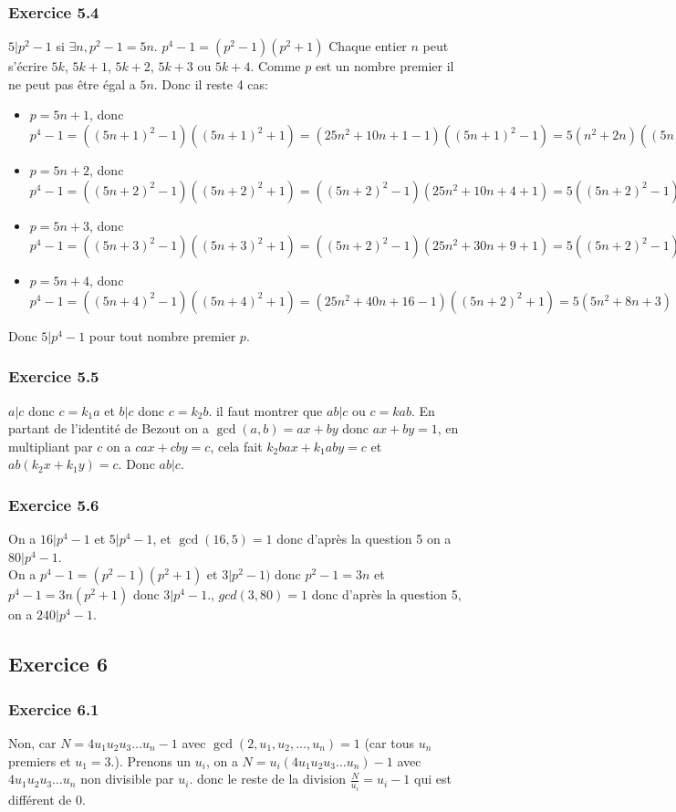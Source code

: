 \documentclass[]{book}
\theoremstyle{definition}
\begin{document}
\subsubsection*{Exercice 5.4}
$5 | p^2-1$ si $\exists n, p^2-1 = 5n$. 
$p^4 -1 = (p^2-1)(p^2+1)$
Chaque entier $n$ peut s'\'ecrire $5k$, $5k+1$, $5k+2$, $5k+3$ ou $5k+4$. Comme $p$ est un nombre premier il ne peut pas \^etre \'egal a $5n$. Donc il reste 4 cas:
\begin{itemize}
\item $p = 5n+1$, donc $p^4-1 = ((5n+1)^2-1)((5n+1)^2+1) = (25n^2+10n+1-1)((5n+1)^2-1) = 5(n^2+2n)((5n+1)^2-1)$
\item $p = 5n+2$, donc $p^4-1 = ((5n+2)^2-1)((5n+2)^2+1) = ((5n+2)^2-1)(25n^2+10n+4+1) = 5((5n+2)^2-1)(5n^2+2n+1)$
\item $p = 5n+3$, donc $p^4-1 = ((5n+3)^2-1)((5n+3)^2+1) = ((5n+2)^2-1)(25n^2+30n+9+1) = 5((5n+2)^2-1)(5n^2+6n+2)$
\item $p = 5n+4$, donc $p^4-1 = ((5n+4)^2-1)((5n+4)^2+1) = (25n^2+40n+16-1)((5n+2)^2+1) = 5(5n^2+8n+3)((5n+2)^2-1)$
\end{itemize}
Donc $5|p^4 -1$ pour tout nombre premier $p$.

\subsubsection*{Exercice 5.5}
$a | c$ donc $c = k_1a$ et $b | c$ donc $c = k_2b$. il faut montrer que $ab | c$ ou $c = kab$. En partant de l'identit\'e de Bezout on a $\gcd(a,b) = ax+ by$ donc $ax + by =1$, en multipliant par $c$ on a $cax+cby = c$, cela fait $k_2bax + k_1aby = c$ et $ab(k_2x+k_1y) = c$. Donc $ab| c$.


\subsubsection*{Exercice 5.6}
On a $16| p^4-1$ et $5|p^4-1$, et $\gcd(16, 5) = 1$ donc d'apr\`es la question 5 on a $80| p^4-1$.\\
On a $p^4-1 = (p^2-1)(p^2+1)$ et $3|p^2-1)$ donc $p^2-1 = 3n$ et $p^4-1 = 3n(p^2+1)$ donc $3|p^4-1$., $gcd(3,80) = 1$ donc d'apr\`es la question 5, on a $240|p^4-1$.

\subsection*{Exercice 6}
\subsubsection*{Exercice 6.1}
Non, car $N = 4u_1u_2u_3\ldots u_n -1$ avec $\gcd(2,u_1, u_2, \ldots, u_n) = 1$ (car tous $u_n$ premiers et $u_1=3$.). Prenons un $u_i$, on a $N = u_i(4u_1u_2u_3\ldots u_n) -1$ avec $4u_1u_2u_3\ldots u_n$ non divisible par $u_i$. donc le reste de la division $\frac{N}{u_i} = u_i-1$ qui est diff\'erent de 0.
\end{document}

